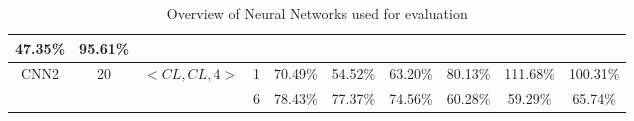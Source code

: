 \begin{landscape}
\begin{table}[htbp]
\begin{tabular}{|cccc|ccc|ccc|}
  \multicolumn{1}{c|}{47.35\%} &
  95.61\% \\ \hline
\multicolumn{1}{|c|}{\multirow{2}{*}{CNN2}} &
  \multicolumn{1}{c|}{\multirow{2}{*}{20}} &
  \multicolumn{1}{c|}{\multirow{2}{*}{$<CL,CL,4>$}} &
  1 &
  \multicolumn{1}{c|}{70.49\%} &
  \multicolumn{1}{c|}{54.52\%} &
  63.20\% &
  \multicolumn{1}{c|}{80.13\%} &
  \multicolumn{1}{c|}{111.68\%} &
  100.31\% \\ \cline{4-10}
\multicolumn{1}{|c|}{} &
  \multicolumn{1}{c|}{} &
  \multicolumn{1}{c|}{} &
  6 &
  \multicolumn{1}{c|}{78.43\%} &
  \multicolumn{1}{c|}{77.37\%} &
  74.56\% &
  \multicolumn{1}{c|}{60.28\%} &
  \multicolumn{1}{c|}{59.29\%} &
  65.74\% \\ \hline
\end{tabular}
\caption{Overview of Neural Networks used for evaluation}
\label{tab:architecture}
\end{table}
\end{landscape}